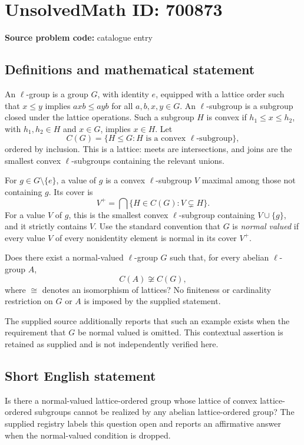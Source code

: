 \documentclass[11pt]{article}
\begin{document}
\section*{UnsolvedMath ID: 700873}
\textbf{Source problem code:} catalogue entry
\subsection{Definitions and mathematical statement}
An \(\ell\)-group is a group \(G\), with identity \(e\), equipped with a lattice order such that \(x\leq y\) implies \(axb\leq ayb\) for all \(a,b,x,y\in G\). An \(\ell\)-subgroup is a subgroup closed under the lattice operations. Such a subgroup \(H\) is convex if \(h_1\leq x\leq h_2\), with \(h_1,h_2\in H\) and \(x\in G\), implies \(x\in H\). Let
\[
C(G)=\{H\leq G:H\text{ is a convex }\ell\text{-subgroup}\},
\]
ordered by inclusion. This is a lattice: meets are intersections, and joins are the smallest convex \(\ell\)-subgroups containing the relevant unions.

For \(g\in G\setminus\{e\}\), a value of \(g\) is a convex \(\ell\)-subgroup \(V\) maximal among those not containing \(g\). Its cover is
\[
V^+=\bigcap\{H\in C(G):V\subsetneq H\}.
\]
For a value \(V\) of \(g\), this is the smallest convex \(\ell\)-subgroup containing \(V\cup\{g\}\), and it strictly contains \(V\). Use the standard convention that \(G\) is \emph{normal valued} if every value \(V\) of every nonidentity element is normal in its cover \(V^+\).

Does there exist a normal-valued \(\ell\)-group \(G\) such that, for every abelian \(\ell\)-group \(A\),
\[
C(A)\not\cong C(G),
\]
where \(\cong\) denotes an isomorphism of lattices? No finiteness or cardinality restriction on \(G\) or \(A\) is imposed by the supplied statement.

The supplied source additionally reports that such an example exists when the requirement that \(G\) be normal valued is omitted. This contextual assertion is retained as supplied and is not independently verified here.
\subsection{Short English statement}
Is there a normal-valued lattice-ordered group whose lattice of convex lattice-ordered subgroups cannot be realized by any abelian lattice-ordered group? The supplied registry labels this question open and reports an affirmative answer when the normal-valued condition is dropped.
\end{document}
